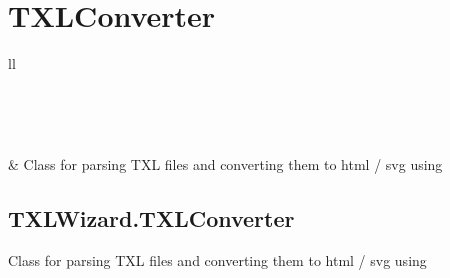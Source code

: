 \documentclass[letterpaper,10pt,english]{sphinxmanual}
\begin{document}
\section{TXLConverter}
\label{Chapters/40_PythonModuleReference:txlconverter}
\begin{longtable}{ll}
\hline
\endfirsthead

%
{{}} \\
\hline
\endhead

\hline {} \\ \hline
\endfoot

\endlastfoot


{\hyperref[Chapters/PythonModuleReference/TXLConverter/TXLWizard.TXLConverter:module\string-TXLWizard.TXLConverter]{}}
 & 
Class for parsing TXL files and converting them to html / svg using {\hyperref[Chapters/PythonModuleReference/TXLWriter/TXLWizard.TXLWriter:module\string-TXLWizard.TXLWriter]{}}
\\
\hline\end{longtable}



\subsection{TXLWizard.TXLConverter}
\label{Chapters/PythonModuleReference/TXLConverter/TXLWizard.TXLConverter:txlwizard-txlconverter}\label{Chapters/PythonModuleReference/TXLConverter/TXLWizard.TXLConverter::doc}\label{Chapters/PythonModuleReference/TXLConverter/TXLWizard.TXLConverter:module-TXLWizard.TXLConverter}
Class for parsing TXL files and converting them to html / svg using {\hyperref[Chapters/PythonModuleReference/TXLWriter/TXLWizard.TXLWriter:module\string-TXLWizard.TXLWriter]{}}
\end{document}
